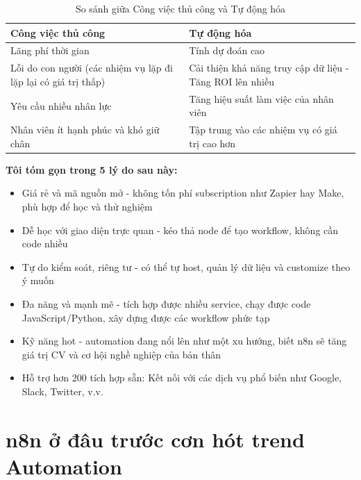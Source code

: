 \begin{table}[h]
    \centering
    \renewcommand{\arraystretch}{1.5}
    \begin{tabular}{| m{6cm} | m{6cm} |}
        \hline
        \textbf{Công việc thủ công} & \textbf{Tự động hóa} \\
        \hline
        Lãng phí thời gian & Tính dự đoán cao \\
        \hline
        Lỗi do con người (các nhiệm vụ lặp đi lặp lại có giá trị thấp) & Cải thiện khả năng truy cập dữ liệu - Tăng ROI lên nhiều\\
        \hline
        Yêu cầu nhiều nhân lực & Tăng hiệu suất làm việc của nhân viên \\
        \hline
        Nhân viên ít hạnh phúc và khó giữ chân & Tập trung vào các nhiệm vụ có giá trị cao hơn \\
        \hline
    \end{tabular}
    \caption{So sánh giữa Công việc thủ công và Tự động hóa}
\end{table}

\textbf{Tôi tóm gọn trong 5 lý do sau này:}

\begin{itemize}
    \item Giá rẻ và mã nguồn mở - không tốn phí subscription như Zapier hay Make, phù hợp để học và thử nghiệm
    \item Dễ học với giao diện trực quan - kéo thả node để tạo workflow, không cần code nhiều
    \item Tự do kiểm soát, riêng tư - có thể tự host, quản lý dữ liệu và customize theo ý muốn
    \item Đa năng và mạnh mẽ - tích hợp được nhiều service, chạy được code JavaScript/Python, xây dựng được các workflow phức tạp
    \item Kỹ năng hot - automation đang nổi lên như một xu hướng, biết n8n sẽ tăng giá trị CV và cơ hội nghề nghiệp của bản thân
    \item Hỗ trợ hơn 200 tích hợp sẵn: Kết nối với các dịch vụ phổ biến như Google, Slack, Twitter, v.v.
\end{itemize}

\section{n8n ở đâu trước cơn hót trend Automation}


